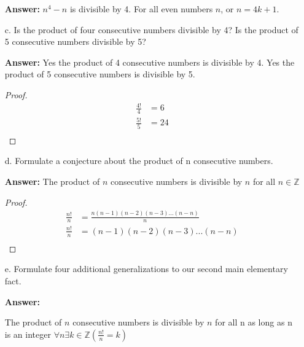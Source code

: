 \documentclass{article}
\begin{document}
\begin{itemize}
\begin{proof}
\begin{align*}
            &= \frac{n(n - 1)(n^2 + n + 1)}{4} \\
            f(x) &= \frac{n}{4} \\
            g(x) &= \frac{n - 1}{4} \\
            h(x) &= \frac{n^2 + n + 1}{4} \\
        \end{align*}
    \end{proof}
    \item[] \textbf{Answer:} $n^4 - n$ is divisible by 4. For all even numbers $n$, or $n = 4k + 1$.
    \item[]
    \item[c.] Is the product of four consecutive numbers divisible by 4? Is the product of 5 
    consecutive numbers divisible by 5?
    \item[]
    \item[] \textbf{Answer:} Yes the product of 4 consecutive numbers is divisible by 4. Yes the product of 5 consecutive numbers is divisible by 5.
    \begin{proof}
        \begin{align*}
            \frac{4!}{4} &= 6 \\
            \frac{5!}{5} &= 24 \\
        \end{align*}
    \end{proof}
    \item[]
    \item[d.] Formulate a conjecture about the product of n consecutive numbers.
    \item[] \textbf{Answer:} The product of $n$ consecutive numbers is divisible by $n$ for all $n \in \mathbb{Z}$
    \begin{proof}
        \begin{align*}
            \frac{n!}{n} &= \frac{n(n - 1)(n - 2)(n - 3)...(n - n)}{n} \\
            \frac{n!}{n} &= (n - 1)(n - 2)(n - 3)...(n - n) \\
        \end{align*}
    \end{proof}
    \item[] 
    \item[e.] Formulate four additional generalizations to our second main elementary fact.
    \item[] \textbf{Answer:}
    \item[] The product of $n$ consecutive numbers is divisible by $n$ for all n as long as n is an integer $\forall n \exists k \in \mathbb{Z}(\frac{n!}{n}=k)$ 
     
\end{itemize}
\end{document}
